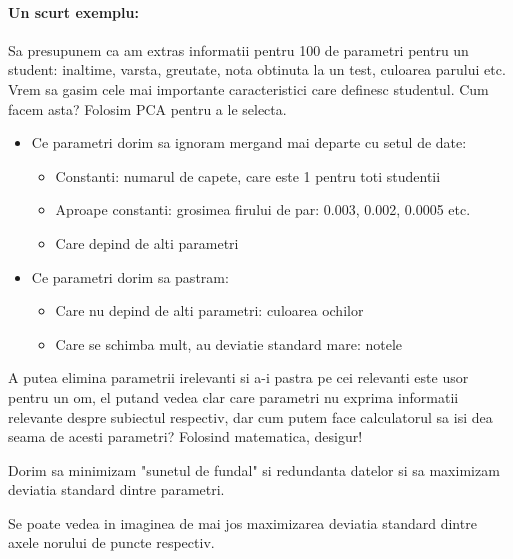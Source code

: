 \documentclass[12pt,oneside]{article}
\begin{document}
\paragraph{Un scurt exemplu: \cite{data_reduction}}
Sa presupunem ca am extras informatii pentru 100 de parametri pentru un student: inaltime, varsta, greutate, nota obtinuta la un test, culoarea parului etc. Vrem sa gasim cele mai importante caracteristici care definesc studentul. Cum facem asta? Folosim PCA pentru a le selecta.

\begin{itemize}
	\item Ce parametri dorim sa ignoram mergand mai departe cu setul de date:
	\begin{itemize}
	\item Constanti: numarul de capete, care este 1 pentru toti studentii
	\item Aproape constanti: grosimea firului de par: 0.003, 0.002, 0.0005 etc.
	\item Care depind de alti parametri
	\end{itemize}
	\item Ce parametri dorim sa pastram:
	\begin{itemize}
	\item Care nu depind de alti parametri: culoarea ochilor
	\item Care se schimba mult, au deviatie standard mare: notele
	\end{itemize}
\end{itemize}

A putea elimina parametrii irelevanti si a-i pastra pe cei relevanti este usor pentru un om, el putand vedea clar care parametri nu exprima informatii relevante despre subiectul respectiv, dar cum putem face calculatorul sa isi dea seama de acesti parametri? Folosind matematica, desigur!

Dorim sa minimizam "sunetul de fundal" si redundanta datelor si sa maximizam deviatia standard dintre parametri.

Se poate vedea in imaginea de mai jos maximizarea deviatia standard dintre axele norului de puncte respectiv.\cite{pca_shlens}
\end{document}

